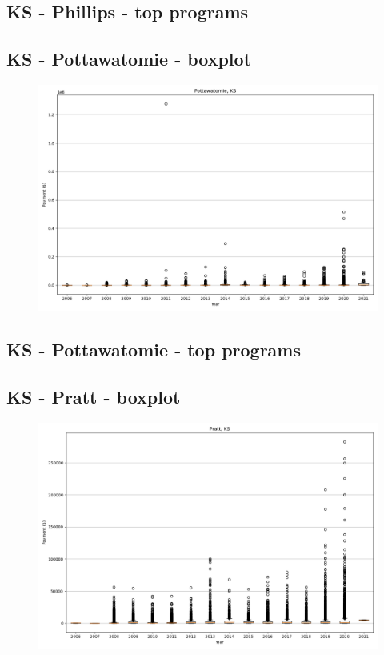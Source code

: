 \subsection*{KS - Phillips - top programs}

\newpage
\subsection*{KS - Pottawatomie - boxplot}
\begin{figure}[h]
\centering
\includegraphics[width=7in]{../output/boxplots/counties/Pottawatomie-KS_boxplot.png}
\end{figure}


\subsection*{KS - Pottawatomie - top programs}

\newpage
\subsection*{KS - Pratt - boxplot}
\begin{figure}[h]
\centering
\includegraphics[width=7in]{../output/boxplots/counties/Pratt-KS_boxplot.png}
\end{figure}


